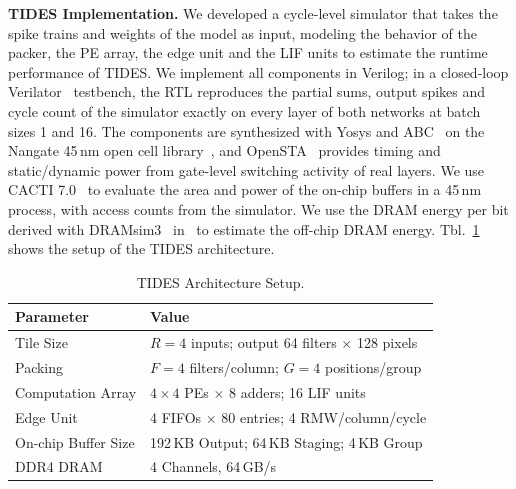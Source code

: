 \textbf{TIDES Implementation.} We developed a cycle-level simulator that takes the spike trains and
weights of the model as input, modeling the behavior of the packer, the PE array, the edge unit and the
LIF units to estimate the runtime performance of TIDES. We implement all components in Verilog; in a
closed-loop Verilator~\cite{verilator} testbench, the RTL reproduces the partial sums, output spikes
and cycle count of the simulator exactly on every layer of both networks at batch sizes 1 and 16. The
components are synthesized with Yosys and ABC~\cite{yosys} on the Nangate 45\,nm open cell
library~\cite{nangate45}, and OpenSTA~\cite{opensta} provides timing and static/dynamic power from
gate-level switching activity of real layers. We use CACTI 7.0~\cite{cacti7} to evaluate the area and
power of the on-chip buffers in a 45\,nm process, with access counts from the simulator. We use the DRAM
energy per bit derived with DRAMsim3~\cite{dramsim3} in~\cite{prosperity2025} to estimate the off-chip
DRAM energy. Tbl.~\ref{tab:setup} shows the setup of the TIDES architecture.

\begin{table}[t]
  \centering
  \caption{TIDES Architecture Setup.}
  \label{tab:setup}
  \small
  \setlength{\tabcolsep}{4pt}
  \begin{tabular}{@{}ll@{}}
    \toprule
    Parameter & Value \\
    \midrule
    Tile Size           & $R=4$ inputs; output 64 filters $\times$ 128 pixels \\
    Packing             & $F=4$ filters/column; $G=4$ positions/group \\
    Computation Array   & $4\times4$ PEs $\times$ 8 adders; 16 LIF units \\
    Edge Unit           & 4 FIFOs $\times$ 80 entries; 4 RMW/column/cycle \\
    On-chip Buffer Size & 192\,KB Output; 64\,KB Staging; 4\,KB Group \\
    DDR4 DRAM           & 4 Channels, 64\,GB/s \\
    \bottomrule
  \end{tabular}
\end{table}

